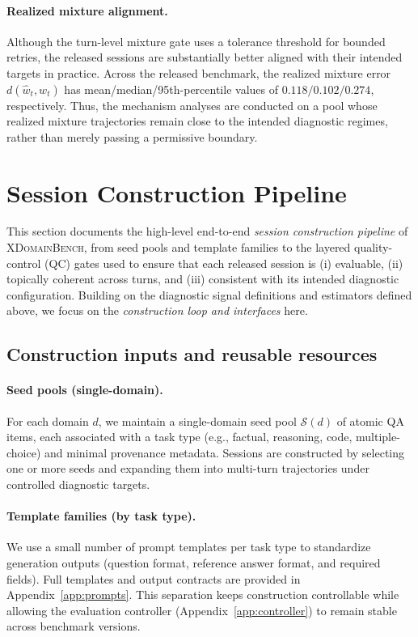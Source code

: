 \paragraph{Realized mixture alignment.}
Although the turn-level mixture gate uses a tolerance threshold for bounded retries,
the released sessions are substantially better aligned with their intended targets in practice.
Across the released benchmark, the realized mixture error 
\(d(\hat{w}_t,w_t)\) has mean/median/95th-percentile values of 
\(0.118/0.102/0.274\), respectively.
Thus, the mechanism analyses are conducted on a pool whose realized mixture trajectories remain close to the intended diagnostic regimes, 
rather than merely passing a permissive boundary.

\section{Session Construction Pipeline}
\label{app:dataset_construction}

This section documents the high-level end-to-end \emph{session construction pipeline} of \textsc{XDomainBench}, from seed pools and template families to the layered quality-control (QC) gates used to ensure that
each released session is (i) evaluable, (ii) topically coherent across turns, and (iii) consistent with its intended diagnostic configuration. 
Building on the diagnostic signal definitions and estimators defined above, we focus on the \emph{construction loop and interfaces} here. 

\subsection{Construction inputs and reusable resources}
\label{app:construction_inputs}

\paragraph{Seed pools (single-domain).}
For each domain $d$, we maintain a single-domain seed pool $\mathcal{S}(d)$ of atomic QA items, each associated with a task type (e.g., factual, reasoning, code, multiple-choice) and minimal provenance metadata.
Sessions are constructed by selecting one or more seeds and expanding them into multi-turn trajectories under controlled diagnostic targets.

\paragraph{Template families (by task type).}
We use a small number of prompt templates per task type to standardize generation outputs (question format, reference answer format, and required fields).
Full templates and output contracts are provided in Appendix~\ref{app:prompts}.
This separation keeps construction controllable while allowing the evaluation controller (Appendix~\ref{app:controller}) to remain stable across benchmark versions.

